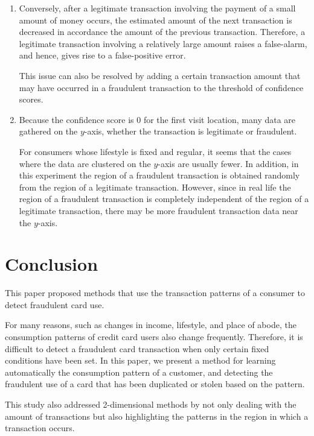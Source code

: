 \documentclass[final,authoryear,5p,times,twocolumn]{elsarticle}
\begin{document}
\begin{enumerate}
\item Conversely, after a legitimate transaction involving the payment of a small amount of money occurs, the estimated amount of the next transaction is decreased in accordance the amount of the previous transaction. Therefore, a legitimate transaction involving a relatively large amount raises a false-alarm, and hence, gives rise to a false-positive error.

This issue can also be resolved by adding a certain transaction amount that may have occurred in a fraudulent transaction to the threshold of confidence scores.

\item Because the confidence score is 0 for the first visit location, many data are gathered on the $y$-axis, whether the transaction is legitimate or fraudulent.

For consumers whose lifestyle is fixed and regular, it seems that the cases where the data are clustered on the $y$-axis are usually fewer. In addition, in this experiment the region of a fraudulent transaction is obtained randomly from the region of a legitimate transaction. However, since in real life the region of a fraudulent transaction is completely independent of the region of a legitimate transaction, there may be more fraudulent transaction data near the $y$-axis.
\end{enumerate}

\section{Conclusion}
\label{section:Sec7}
This paper proposed methods that use the transaction patterns of a consumer to detect fraudulent card use.

For many reasons, such as changes in income, lifestyle, and place of abode, the consumption patterns of credit card users also change frequently. Therefore, it is difficult to detect a fraudulent card transaction when only certain fixed conditions have been set. In this paper, we present a method for learning automatically the consumption pattern of a customer, and detecting the fraudulent use of a card that has been duplicated or stolen based on the pattern.

This study also addressed 2-dimensional methods by not only dealing with the amount of transactions but also highlighting the patterns in the region in which a transaction occurs.





\end{document}
